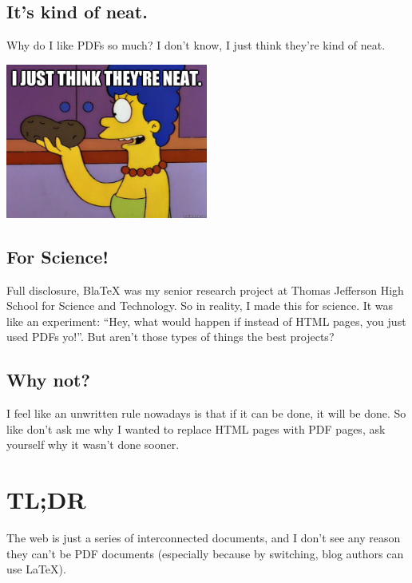 \documentclass[12pt]{article}
\begin{document}
  \subsection{It's kind of neat.}

  Why do I like PDFs so much? I don't know, I just think they're kind of neat. 
  \begin{center}
  \includegraphics[height=2in]{neat}
  \end{center}

  \subsection{For Science!}

  Full disclosure, BlaTeX was my senior research project at Thomas Jefferson High School for Science and Technology. So in reality, I made this for science. It was like an experiment: ``Hey, what would happen if instead of HTML pages, you just used PDFs yo!''. But aren't those types of things the best projects?


  \subsection{Why not?}

  I feel like an unwritten rule nowadays is that if it can be done, it will be done. So like don't ask me why I wanted to replace HTML pages with PDF pages, ask yourself why it wasn't done sooner. 

  \section{TL;DR}

  The web is just a series of interconnected documents, and I don't see any reason they can't be PDF documents (especially because by switching, blog authors can use LaTeX). 
\end{document}
